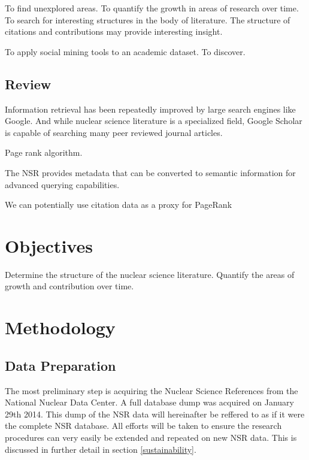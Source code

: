 \documentclass[12pt]{article}
\begin{document}
\begin{doublespacing}
To find unexplored areas.
To quantify the growth in areas of research over time.
To search for interesting structures in the body of literature. The structure of citations and contributions may provide interesting insight.

To apply social mining tools to an academic dataset.
To discover.


\subsection{Review}
Information retrieval has been repeatedly improved by large search engines like Google.
And while nuclear science literature is a specialized field, Google Scholar is capable of searching many peer reviewed journal articles.

Page rank algorithm.

The NSR provides metadata that can be converted to semantic information for advanced querying capabilities.

We can potentially use citation data as a proxy for PageRank



\pagebreak
\section{Objectives}
Determine the structure of the nuclear science literature.
Quantify the areas of growth and contribution over time.

\pagebreak
\section{Methodology}

\subsection{Data Preparation}
The most preliminary step is acquiring the Nuclear Science References from the National Nuclear Data Center.
A full database dump was acquired on January 29th 2014.
This dump of the NSR data will hereinafter be reffered to as if it were the complete NSR database.
All efforts will be taken to ensure the research procedures can very easily be extended and repeated on new NSR data.
This is discussed in further detail in section \ref{sustainability}.


\end{doublespacing}
\end{document}
